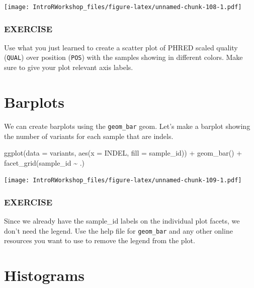 \documentclass[
]{book}
\newenvironment{Shaded}{\begin{snugshade}}{\end{snugshade}}
\newcommand{\AttributeTok}[1]{\textcolor[rgb]{0.77,0.63,0.00}{#1}}
\newcommand{\FunctionTok}[1]{\textcolor[rgb]{0.00,0.00,0.00}{#1}}
\newcommand{\NormalTok}[1]{#1}
\newcommand{\SpecialCharTok}[1]{\textcolor[rgb]{0.00,0.00,0.00}{#1}}
\begin{document}
\texttt{[image: IntroRWorkshop\_files/figure-latex/unnamed-chunk-108-1.pdf]}

\hypertarget{exercise-4}{%
\subsubsection*{EXERCISE}\label{exercise-4}}

Use what you just learned to create a scatter plot of PHRED scaled quality (\texttt{QUAL}) over position (\texttt{POS}) with the samples showing in different colors. Make sure to give your plot relevant axis labels.

\hypertarget{barplots}{%
\section{Barplots}\label{barplots}}

We can create barplots using the \texttt{geom\_bar} geom. Let's make a barplot showing the number of variants for each sample that are indels.

\begin{Shaded}
\begin{Highlighting}[]
\FunctionTok{ggplot}\NormalTok{(}\AttributeTok{data =}\NormalTok{ variants, }\FunctionTok{aes}\NormalTok{(}\AttributeTok{x =}\NormalTok{ INDEL, }\AttributeTok{fill =}\NormalTok{ sample\_id)) }\SpecialCharTok{+}
  \FunctionTok{geom\_bar}\NormalTok{() }\SpecialCharTok{+}
  \FunctionTok{facet\_grid}\NormalTok{(sample\_id }\SpecialCharTok{\textasciitilde{}}\NormalTok{ .)}
\end{Highlighting}
\end{Shaded}

\texttt{[image: IntroRWorkshop\_files/figure-latex/unnamed-chunk-109-1.pdf]}

\hypertarget{exercise-5}{%
\subsubsection*{EXERCISE}\label{exercise-5}}

Since we already have the sample\_id labels on the individual plot facets, we don't need the legend. Use the help file for \texttt{geom\_bar} and any other online resources you want to use to remove the legend from the plot.

\hypertarget{histograms}{%
\section{Histograms}\label{histograms}}
\end{document}
